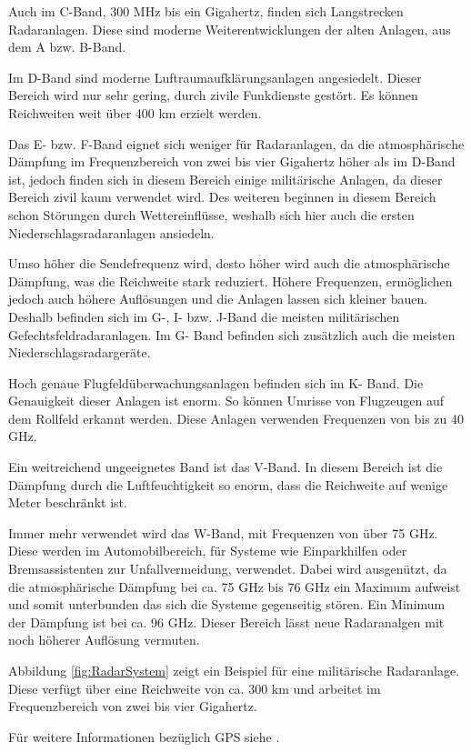 Auch im C-Band, 300 MHz bis ein Gigahertz, finden sich Langstrecken Radaranlagen. Diese sind moderne Weiterentwicklungen der alten Anlagen, aus dem A bzw. B-Band.

Im D-Band sind moderne Luftraumaufklärungsanlagen angesiedelt. Dieser Bereich wird nur sehr gering, durch zivile Funkdienste gestört. Es können Reichweiten weit über 400 km erzielt werden.

Das E- bzw. F-Band eignet sich weniger für Radaranlagen, da die atmosphärische Dämpfung im Frequenzbereich von zwei bis vier Gigahertz höher als im D-Band ist, jedoch finden sich in diesem Bereich einige militärische Anlagen, da dieser Bereich zivil kaum verwendet wird. Des weiteren beginnen in diesem Bereich schon Störungen durch Wettereinflüsse, weshalb sich hier auch die ersten Niederschlagsradaranlagen ansiedeln.

Umso höher die Sendefrequenz wird, desto höher wird auch die atmosphärische Dämpfung, was die Reichweite stark reduziert. Höhere Frequenzen, ermöglichen jedoch auch höhere Auflösungen und die Anlagen lassen sich kleiner bauen. Deshalb befinden sich im G-, I- bzw. J-Band die meisten militärischen Gefechtsfeldradaranlagen. Im G- Band befinden sich zusätzlich auch die meisten Niederschlagsradargeräte. 

Hoch genaue Flugfeldüberwachungsanlagen befinden sich im K- Band. Die Genauigkeit dieser Anlagen ist enorm. So können Umrisse von Flugzeugen auf dem Rollfeld erkannt werden. Diese Anlagen verwenden Frequenzen von bis zu 40 GHz. 

Ein weitreichend ungeeignetes Band ist das V-Band. In diesem Bereich ist die Dämpfung durch die Luftfeuchtigkeit so enorm, dass die Reichweite auf wenige Meter beschränkt ist.

Immer mehr verwendet wird das W-Band, mit Frequenzen von über 75 GHz. Diese werden im Automobilbereich, für Systeme wie Einparkhilfen oder Bremsassistenten zur Unfallvermeidung, verwendet. Dabei wird ausgenützt, da die atmosphärische Dämpfung bei ca. 75 GHz bis 76 GHz ein Maximum aufweist und somit unterbunden das sich die Systeme gegenseitig stören. Ein Minimum der Dämpfung ist bei ca. 96 GHz. Dieser Bereich lässt neue Radaranalgen mit noch höherer Auflösung vermuten.

Abbildung \ref{fig:RadarSystem} zeigt ein Beispiel für eine militärische Radaranlage. Diese verfügt über eine Reichweite von ca. 300 km und arbeitet im Frequenzbereich von zwei bis vier Gigahertz.

Für weitere Informationen bezüglich GPS siehe \cite{RadarInfo}.

